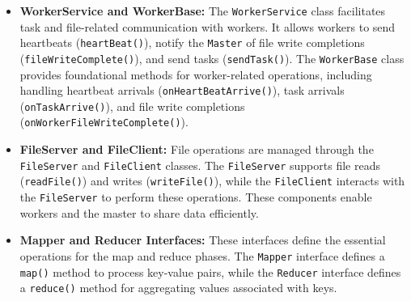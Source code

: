 \begin{itemize}
    \item \textbf{WorkerService and WorkerBase:} The \texttt{WorkerService} class facilitates task and file-related communication with workers. It allows workers to send heartbeats (\texttt{heartBeat()}), notify the \texttt{Master} of file write completions (\texttt{fileWriteComplete()}), and send tasks (\texttt{sendTask()}). The \texttt{WorkerBase} class provides foundational methods for worker-related operations, including handling heartbeat arrivals (\texttt{onHeartBeatArrive()}), task arrivals (\texttt{onTaskArrive()}), and file write completions (\texttt{onWorkerFileWriteComplete()}).
    \item \textbf{FileServer and FileClient:} File operations are managed through the \texttt{FileServer} and \texttt{FileClient} classes. The \texttt{FileServer} supports file reads (\texttt{readFile()}) and writes (\texttt{writeFile()}), while the \texttt{FileClient} interacts with the \texttt{FileServer} to perform these operations. These components enable workers and the master to share data efficiently.
    \item \textbf{Mapper and Reducer Interfaces:} These interfaces define the essential operations for the map and reduce phases. The \texttt{Mapper} interface defines a \texttt{map()} method to process key-value pairs, while the \texttt{Reducer} interface defines a \texttt{reduce()} method for aggregating values associated with keys.
\end{itemize}
